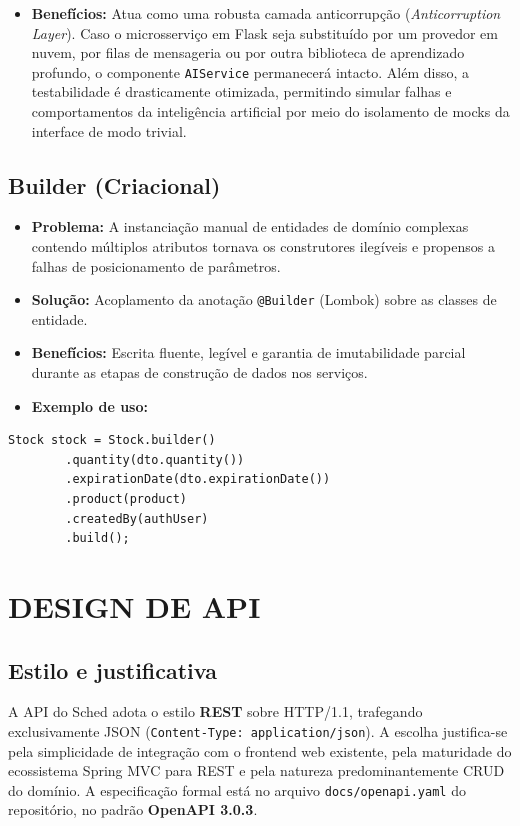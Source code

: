 \documentclass[12pt,a4paper]{article}
\begin{document}
\begin{itemize}
    \item \textbf{Benefícios:} Atua como uma robusta camada anticorrupção (\textit{Anticorruption Layer}). Caso o microsserviço em Flask seja substituído por um provedor em nuvem, por filas de mensageria ou por outra biblioteca de aprendizado profundo, o componente \texttt{AIService} permanecerá intacto. Além disso, a testabilidade é drasticamente otimizada, permitindo simular falhas e comportamentos da inteligência artificial por meio do isolamento de mocks da interface de modo trivial.
\end{itemize}

\subsection{Builder (Criacional)}
\begin{itemize}
    \item \textbf{Problema:} A instanciação manual de entidades de domínio complexas contendo múltiplos atributos tornava os construtores ilegíveis e propensos a falhas de posicionamento de parâmetros.
    \item \textbf{Solução:} Acoplamento da anotação \texttt{@Builder} (Lombok) sobre as classes de entidade.
    \item \textbf{Benefícios:} Escrita fluente, legível e garantia de imutabilidade parcial durante as etapas de construção de dados nos serviços.
    \item \textbf{Exemplo de uso:}
\end{itemize}

\begin{lstlisting}
Stock stock = Stock.builder()
        .quantity(dto.quantity())
        .expirationDate(dto.expirationDate())
        .product(product)
        .createdBy(authUser)
        .build();
\end{lstlisting}

\newpage
\section{DESIGN DE API}

\subsection{Estilo e justificativa}

A API do Sched adota o estilo \textbf{REST} sobre HTTP/1.1, trafegando exclusivamente JSON (\texttt{Content-Type: application/json}). A escolha justifica-se pela simplicidade de integração com o frontend web existente, pela maturidade do ecossistema Spring MVC para REST e pela natureza predominantemente CRUD do domínio. A especificação formal está no arquivo \texttt{docs/openapi.yaml} do repositório, no padrão \textbf{OpenAPI 3.0.3}.
\end{document}
